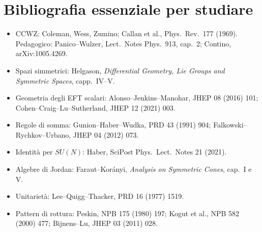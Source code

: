 \documentclass[11pt,a4paper]{article}
\numberwithin{equation}{section}
\theoremstyle{remark}
\begin{document}
\section*{Bibliografia essenziale per studiare}
\begin{itemize}[nosep]
\item CCWZ: Coleman, Wess, Zumino; Callan et al., Phys.\ Rev.\ 177 (1969). Pedagogico: Panico--Wulzer, Lect.\ Notes Phys.\ 913, cap.~2; Contino, arXiv:1005.4269.
\item Spazi simmetrici: Helgason, \emph{Differential Geometry, Lie Groups and Symmetric Spaces}, capp.~IV--V.
\item Geometria degli EFT scalari: Alonso--Jenkins--Manohar, JHEP 08 (2016) 101; Cohen--Craig--Lu--Sutherland, JHEP 12 (2021) 003.
\item Regole di somma: Gunion--Haber--Wudka, PRD 43 (1991) 904; Falkowski--Rychkov--Urbano, JHEP 04 (2012) 073.
\item Identità per $SU(N)$: Haber, SciPost Phys.\ Lect.\ Notes 21 (2021).
\item Algebre di Jordan: Faraut--Korányi, \emph{Analysis on Symmetric Cones}, cap.~I e V.
\item Unitarietà: Lee--Quigg--Thacker, PRD 16 (1977) 1519.
\item Pattern di rottura: Peskin, NPB 175 (1980) 197; Kogut et al., NPB 582 (2000) 477; Bijnens--Lu, JHEP 03 (2011) 028.
\end{itemize}
\end{document}

